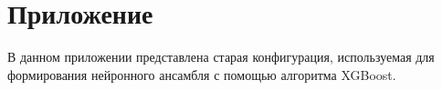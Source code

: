 \documentclass[14pt, a4paper]{bsu}
\begin{document}
\newpage

\titleformat{\section}[block]{\large\bfseries\filcenter}{}{0em}{}

\newpage

\printbibliography[heading=bibintoc,title={Список использованной литературы}]

\newpage

\appendix

\renewcommand{\chaptermark}[1]{\markboth{}{}}
\renewcommand{\sectionmark}[1]{\markright{\arabic{section}.\ #1}}

\titleformat{\section}[block]{\large\bfseries\filcenter}{}{0em}{}

 \label{sec:attachements}

\section{Приложение }
\label{subsec:old_polaris_learn_config}

В данном приложении представлена старая конфигурация, используемая для формирования нейронного ансамбля с помощью алгоритма XGBoost.


\end{document}
